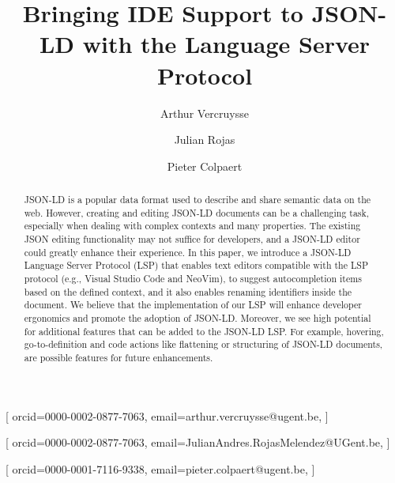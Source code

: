 \documentclass[
]{ceurart}
\begin{document}


\title{Bringing IDE Support to JSON-LD with the Language Server Protocol}


\author[1]{Arthur Vercruysse}[%
orcid=0000-0002-0877-7063,
email=arthur.vercruysse@ugent.be,
]
\author[1]{Julian Rojas}[%
orcid=0000-0002-0877-7063,
email=JulianAndres.RojasMelendez@UGent.be,
]
\author[1]{Pieter Colpaert}[%
orcid=0000-0001-7116-9338,
email=pieter.colpaert@ugent.be,
]
\cormark[1]
\fnmark[1]
\address[1]{IDLab, Department of Electronics and Information Systems, Ghent University – imec}


\begin{abstract}
  JSON-LD is a popular data format used to describe and share semantic data on the web.
  However, creating and editing JSON-LD documents can be a challenging task, especially when dealing with complex contexts and many properties.
  The existing JSON editing functionality may not suffice for developers, and a JSON-LD editor could greatly enhance their experience.
  In this paper, we introduce a JSON-LD Language Server Protocol (LSP) that enables text editors compatible with the LSP protocol (e.g., Visual Studio Code and NeoVim), to suggest autocompletion items based on the defined context, and it also enables renaming identifiers inside the document.
  We believe that the implementation of our LSP will enhance developer ergonomics and promote the adoption of JSON-LD.
  Moreover, we see high potential for additional features that can be added to the JSON-LD LSP.
  For example, hovering, go-to-definition and code actions like flattening or structuring of JSON-LD documents, are possible features for future enhancements.
\end{abstract}
\end{document}
